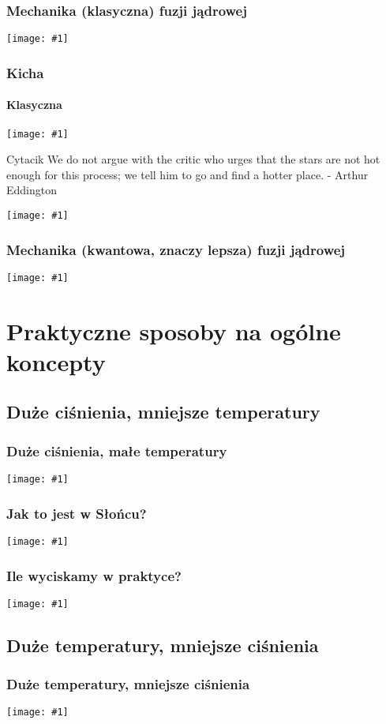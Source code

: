 \documentclass{beamer}
\newcommand {\framedgraphic}[1] {
        \begin{center}
            \texttt{[image: \#1]}
        \end{center}
}
\begin{document}
  \begin{frame}
    \frametitle{Mechanika (klasyczna) fuzji jądrowej}
    \framedgraphic{img/energia2.png}
  \end{frame}


  \begin{frame}
    \frametitle{Kicha}
    \framesubtitle{Klasyczna}
    \pause
    \framedgraphic{img/kaszanka.jpg}
  \end{frame}

  \begin{frame}[t]{Cytacik}
    We do not argue with the critic who urges that the stars are not hot enough for this process; we tell him to go and find a hotter place. - Arthur Eddington
    \framedgraphic{img/Eddington}
  \end{frame}


  \begin{frame}
    \frametitle{Mechanika (kwantowa, znaczy lepsza) fuzji jądrowej}
    \framedgraphic{img/energia3.png}
  \end{frame}

  \section{Praktyczne sposoby na ogólne koncepty}
  \subsection{Duże ciśnienia, mniejsze temperatury}
  \begin{frame}
    \frametitle{Duże ciśnienia, małe temperatury}
    \framedgraphic{img/ananas}
  \end{frame}

  \begin{frame}
    \frametitle{Jak to jest w Słońcu?}
    \framedgraphic{img/wikipedia_solarcore}
  \end{frame}

  \begin{frame}
    \frametitle{Ile wyciskamy w praktyce?}
    \framedgraphic{img/pressure_record}
  \end{frame}

  \subsection{Duże temperatury, mniejsze ciśnienia}
  \begin{frame}
    \frametitle{Duże temperatury, mniejsze ciśnienia}
    \framedgraphic{img/campfire.png}
  \end{frame}
\end{document}
